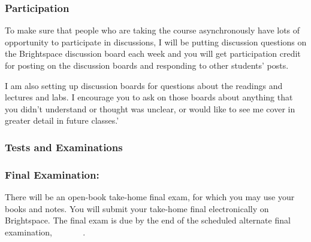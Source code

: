 \documentclass[11pt,twoside]{jgsyllabus}\usepackage[]{graphicx}\usepackage[]{color}
\begin{document}
\subsubsection[Participation]{Participation}
To make sure that people who are taking the course asynchronously have lots of
opportunity to participate in discussions, I will be putting discussion
questions on the Brightspace discussion board each week and you will get
participation credit for posting on the discussion boards and responding to
other students' posts.

I am also setting up discussion boards for questions about the readings and
lectures and labs. I encourage you to ask on those boards about anything that
you didn't understand or thought was unclear, or would like to see me cover
in greater detail in future classes.'

%
%
%
\iffalse
\subsubsection{Homework}
Homework is due at the beginning of class on the day it is assigned.
Late homework will be accepted for half-credit if I receive it before I post the answer key on Brightspace (usually a week after the assignment is due).
\fi
%

\subsubsection{Tests and Examinations}
\iffalse
There will be one in-class midterm exam, on
\textbf{NA}.
This test will be closed book.
I will hold a review session before the test.
\textbf{You will need to bring a calculator, number two pencils, and erasers
to the in-class test.}
\fi
\subsubsection{Final Examination:}
There will be an open-book take-home final exam, for which you may use your
books and notes.
You will submit your take-home final electronically on Brightspace.
The final exam is due by the end of the scheduled
\ifAltFinal alternate \fi final examination,
\ifAltFinal \AltFinalExamEndTime\ \AltFinalExamDay\ \AltFinalExamMonth~\AltFinalExamDate \else
\FinalExamEndTime\ \FinalExamDay\ \FinalExamMonth~\FinalExamDate \fi.
%
\end{document}
